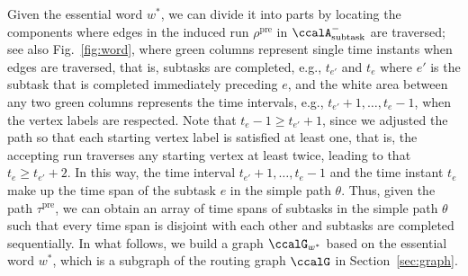 \documentclass[Afour,sageh,times]{sagej}
\newcommand{\auto}[1]{\ccalA_{\textup{#1}}}
\begin{document}
{Given the essential word $w^*$, we can divide it into parts by locating the components where edges in the induced run $\rho^\text{pre}$ in $\auto{subtask}^-$ are traversed; see also Fig.~\ref{fig:word}, where green columns represent single time instants when edges  are traversed, that is, subtasks are completed, e.g., $t_{e'}$ and $t_{e}$ where $e'$ is the subtask that is completed immediately preceding $e$, and the white area between any two green columns represents the time intervals, e.g., $t_{e'}+1, \ldots, t_{e}-1$, when the vertex labels are respected. Note that $t_{e}-1 \geq t_{e'}+1$, since we adjusted the path so that each starting vertex label is satisfied at least one, that is, the accepting run traverses any starting vertex at least twice, leading to that $t_{e} \geq t_{e'}+2$. In this way,  the time interval $t_{e'}+1, \ldots, t_{e}-1$ and the time instant $t_e$ make up the time span of the  subtask $e$ in the simple path $\theta$. Thus, given the path $\tau^\text{pre}$, we can obtain an array of time spans of subtasks in the simple path $\theta$ such that every time span is disjoint with each other and subtasks are completed sequentially. In what follows, we build a graph $\ccalG_{w^*}$ based on the essential word $w^*$, which is a subgraph of the routing graph $\ccalG$ in Section~\ref{sec:graph}.
}
\end{document}
